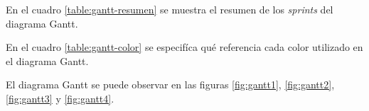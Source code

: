\documentclass[
11pt, %
]{charter}
\begin{document}












En el cuadro \ref{table:gantt-resumen} se muestra el resumen de los \textit{sprints} del diagrama Gantt.

En el cuadro \ref{table:gantt-color} se especifíca qué referencia cada color utilizado en el diagrama Gantt.

El diagrama Gantt se puede observar en las figuras \ref{fig:gantt1}, \ref{fig:gantt2}, \ref{fig:gantt3} y \ref{fig:gantt4}.
\end{document}
